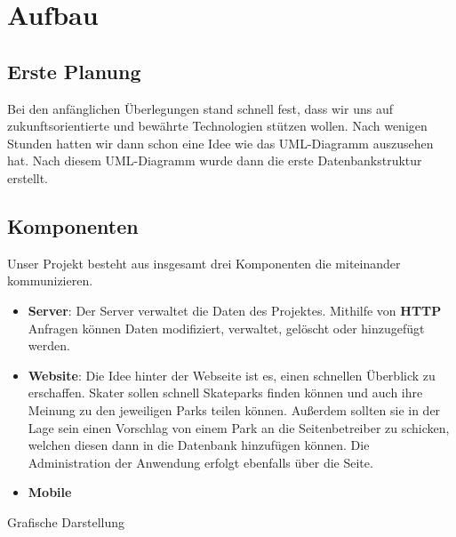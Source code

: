 \chapter{Aufbau}

\section{Erste Planung}
Bei den anfänglichen Überlegungen stand schnell fest, dass wir uns auf zukunftsorientierte und bewährte Technologien 
stützen wollen. Nach wenigen Stunden hatten wir dann schon eine Idee wie das
UML-Diagramm auszusehen hat. Nach diesem UML-Diagramm wurde dann die erste Datenbankstruktur erstellt.

\section{Komponenten}
Unser Projekt besteht aus insgesamt drei Komponenten die miteinander kommunizieren.

\begin{itemize}
    \item \textbf{Server}: Der Server verwaltet die Daten des Projektes. Mithilfe von \textbf{HTTP} Anfragen können Daten modifiziert, verwaltet, gelöscht oder hinzugefügt werden.
    \item \textbf{Website}: Die Idee hinter der Webseite ist es, einen schnellen Überblick zu erschaffen. Skater sollen schnell 
    Skateparks finden können und auch ihre Meinung zu den jeweiligen Parks teilen können. Außerdem sollten 
    sie in der Lage sein einen Vorschlag von einem Park an die Seitenbetreiber zu schicken, welchen 
    diesen dann in die Datenbank hinzufügen können. Die Administration der Anwendung erfolgt ebenfalls
    über die Seite. 
    \item \textbf{Mobile} 
\end{itemize}
Grafische Darstellung

